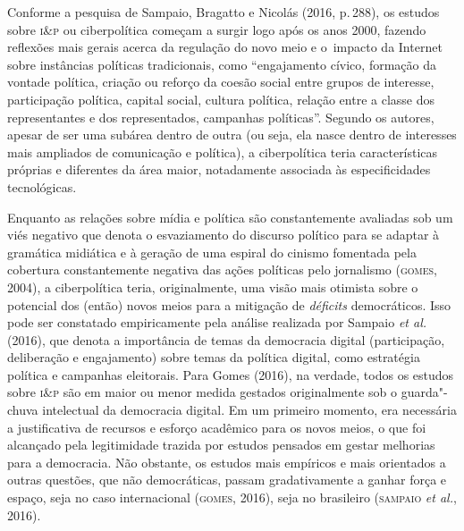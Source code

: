 {Conforme a pesquisa de Sampaio, Bragatto e Nicolás (2016, p.\,288), os
estudos sobre \textsc{i\&p} ou ciberpolítica começam a surgir
logo após os anos 2000, fazendo reflexões mais gerais acerca da
regulação do novo meio e o~impacto da Internet sobre instâncias
políticas tradicionais, como ``engajamento cívico, formação da vontade
política, criação ou reforço da coesão social entre grupos de interesse,
participação política, capital social, cultura política, relação entre a
classe dos representantes e dos representados, campanhas políticas''.
Segundo os autores, apesar de ser uma subárea dentro de outra (ou seja,
ela nasce dentro de interesses mais ampliados de comunicação e
política), a ciberpolítica teria características próprias e diferentes
da área maior, notadamente associada às especificidades tecnológicas.

Enquanto as relações sobre mídia e política são constantemente avaliadas
sob um viés negativo que denota o esvaziamento do discurso político para
se adaptar à gramática midiática e à geração de uma espiral do cinismo
fomentada pela cobertura constantemente negativa das ações políticas
pelo jornalismo (\textsc{gomes}, 2004), a ciberpolítica teria, originalmente, uma
visão mais otimista sobre o potencial dos (então) novos meios para a
mitigação de \textit{déficits} democráticos. Isso pode ser constatado
empiricamente pela análise realizada por Sampaio \textit{et al.} (2016),
que denota a importância de temas da democracia digital (participação,
deliberação e engajamento) sobre temas da política digital, como
estratégia política e campanhas eleitorais. Para Gomes (2016), na
verdade, todos os estudos sobre \textsc{i\&p} são em maior ou
menor medida gestados originalmente sob o guarda"-chuva intelectual da
democracia digital. Em um primeiro momento, era necessária a
justificativa de recursos e esforço acadêmico para os novos meios, o que
foi alcançado pela legitimidade trazida por estudos pensados em gestar
melhorias para a democracia. Não obstante, os estudos mais empíricos e
mais orientados a outras questões, que não democráticas, passam
gradativamente a ganhar força e espaço, seja no caso internacional
(\textsc{gomes}, 2016), seja no brasileiro (\textsc{sampaio} \textit{et al.}, 2016).

}
